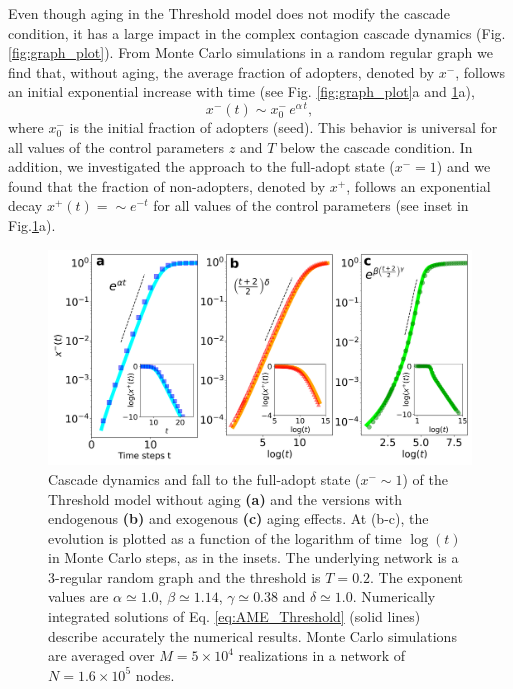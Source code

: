 Even though aging in the Threshold model does not modify the cascade condition, it has a large impact in the complex contagion cascade dynamics (Fig.\ref{fig:graph_plot}). 
From Monte Carlo simulations in a random regular graph we find that, without aging,  the average fraction of adopters, denoted by $x^{-}$, follows an initial exponential increase with time (see Fig. \ref{fig:graph_plot}a and \ref{fig:models}a), 
\begin{equation}
x^{-}(t) \sim x^{-}_{0} \, e^{\alpha \, t},
\label{eq:exponential}
\end{equation}
where $x^{-}_{0}$ is the initial fraction of adopters (seed). This behavior is universal for all values of the control parameters $z$ and $T$ below the cascade condition. In addition, we investigated the approach to the full-adopt state ($x^{-} = 1$) and we found that the fraction of non-adopters, denoted by $x^{+}$, follows an exponential decay $x^{+}(t) = \sim e^{-t}$ for all values of the control parameters (see inset in Fig.\ref{fig:models}a).

\begin{figure}
\centering \captionsetup{font=sf}
\includegraphics[width=0.7\columnwidth]{Figs/Aging_Threshold/EVO_MOD.pdf}
\caption[Cascade dynamics and fall to the full-adopt state ($x^{-} \sim 1$)]{\label{fig:models} Cascade dynamics and fall to the full-adopt state ($x^{-} \sim 1$) of the Threshold model without aging \textbf{(a)} and the versions with endogenous \textbf{(b)} and exogenous \textbf{(c)} aging effects. At (b-c), the evolution is plotted as a function of the logarithm of time $\log{(t)}$ in Monte Carlo steps, as in the insets. The underlying network is a 3-regular random graph and the threshold is $T = 0.2$. The exponent values are $\alpha \simeq 1.0$, $\beta \simeq 1.14$, $\gamma \simeq 0.38$ and $\delta \simeq 1.0$. Numerically integrated solutions of Eq. \eqref{eq:AME_Threshold} (solid lines) describe accurately the numerical results. Monte Carlo simulations are averaged over $M = 5 \times 10^4$ realizations in a network of $N = 1.6 \times 10^5$ nodes.}
\end{figure}

